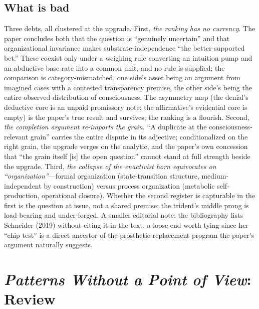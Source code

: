 \documentclass[11pt]{article}
\newcommand{\PP}{\emph{Patterns Without a Point of View}}
\begin{document}
\subsection{What is bad}
Three debts, all clustered at the upgrade. First, \emph{the ranking has no currency}. The paper concludes both that the question is ``genuinely uncertain'' and that organizational invariance makes substrate-independence ``the better-supported bet.'' These coexist only under a weighing rule converting an intuition pump and an abductive base rate into a common unit, and no rule is supplied; the comparison is category-mismatched, one side's asset being an argument from imagined cases with a contested transparency premise, the other side's being the entire observed distribution of consciousness. The asymmetry map (the denial's deductive core is an unpaid promissory note; the affirmative's evidential core is empty) is the paper's true result and survives; the ranking is a flourish. Second, \emph{the completion argument re-imports the grain}. ``A duplicate at the consciousness-relevant grain'' carries the entire dispute in its adjective; conditionalized on the right grain, the upgrade verges on the analytic, and the paper's own concession that ``the grain itself [is] the open question'' cannot stand at full strength beside the upgrade. Third, \emph{the collapse of the enactivist horn equivocates on ``organization''}---formal organization (state-transition structure, medium-independent by construction) versus process organization (metabolic self-production, operational closure). Whether the second register is capturable in the first is the question at issue, not a shared premise; the trident's middle prong is load-bearing and under-forged. A smaller editorial note: the bibliography lists Schneider (2019) without citing it in the text, a loose end worth tying since her ``chip test'' is a direct ancestor of the prosthetic-replacement program the paper's argument naturally suggests.

\section{\PP{}: Review}
\end{document}
